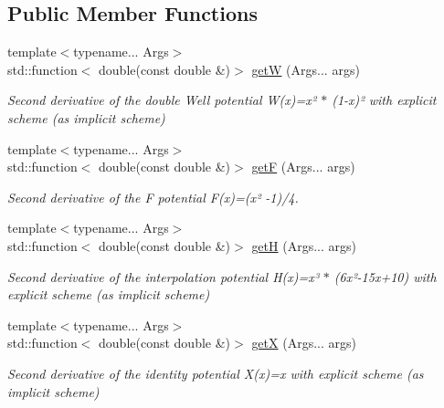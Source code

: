\subsection*{Public Member Functions}
\begin{DoxyCompactItemize}
\item 
{\footnotesize template$<$typename... Args$>$ }\\std\+::function$<$ double(const double \&)$>$ \hyperlink{structpotential__function_3_012_00_01ThermodynamicsPotentialDiscretization_1_1Explicit_01_4_a69caeda1a9238a964b1d05d5bd3ad3ee}{getW} (Args... args)
\begin{DoxyCompactList}\small\item\em Second derivative of the double Well potential W(x)=x² $\ast$ (1-\/x)² with explicit scheme (as implicit scheme) \end{DoxyCompactList}\item 
{\footnotesize template$<$typename... Args$>$ }\\std\+::function$<$ double(const double \&)$>$ \hyperlink{structpotential__function_3_012_00_01ThermodynamicsPotentialDiscretization_1_1Explicit_01_4_a67138582a8c51ddeff1c616e8e2b6f0a}{getF} (Args... args)
\begin{DoxyCompactList}\small\item\em Second derivative of the F potential F(x)=(x² -\/1)/4. \end{DoxyCompactList}\item 
{\footnotesize template$<$typename... Args$>$ }\\std\+::function$<$ double(const double \&)$>$ \hyperlink{structpotential__function_3_012_00_01ThermodynamicsPotentialDiscretization_1_1Explicit_01_4_ad4a73c3a179befc41ece2e5a96d71b1e}{getH} (Args... args)
\begin{DoxyCompactList}\small\item\em Second derivative of the interpolation potential H(x)=x³ $\ast$ (6x²-\/15x+10) with explicit scheme (as implicit scheme) \end{DoxyCompactList}\item 
{\footnotesize template$<$typename... Args$>$ }\\std\+::function$<$ double(const double \&)$>$ \hyperlink{structpotential__function_3_012_00_01ThermodynamicsPotentialDiscretization_1_1Explicit_01_4_a895c9365ab65a8d7836b3ac03159223c}{getX} (Args... args)
\begin{DoxyCompactList}\small\item\em Second derivative of the identity potential X(x)=x with explicit scheme (as implicit scheme) \end{DoxyCompactList}\end{DoxyCompactItemize}



